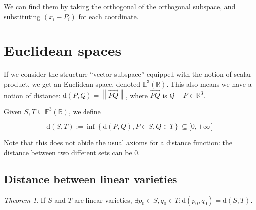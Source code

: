 \documentclass[12pt,a4paper]{report}
\newcommand{\norm}[1]{\left\lVert#1\right\rVert}
\numberwithin{equation}{section}
\theoremstyle{definition}
\theoremstyle{remark}
\newtheorem{theorem}{Theorem}[section]
\begin{document}
We can find them by taking the orthogonal of the orthogonal subspace, and substituting $(x_i - P_i)$ for each coordinate.

\section{Euclidean spaces}

If we consider the structure ``vector subspace'' equipped with the notion of scalar product, we get an Euclidean space, denoted $\mathbb{E} ^3 (\mathbb{R})$. This also means we have a notion of distance: $\text{d}(P, Q) = \norm{\overrightarrow{PQ}}$, where $\overrightarrow{PQ}$ is $Q-P \in \mathbb{R}^3$.

Given $S, T \subseteq \mathbb{E}^3 (\mathbb{R})$, we define

\begin{equation}
\text{d} (S, T) := \inf \left\lbrace \text{d} (P, Q), P \in S, Q \in T\right\rbrace \subseteq [0, +\infty [
\end{equation}

Note that this does not abide the usual axioms for a distance function: the distance between two different sets can be 0.

\subsection{Distance between linear varieties}

\begin{theorem}
If $S$ and $T$ are linear varieties, $\exists p_0 \in S, q_0 \in T : \text{d} (p_0, q_0) = \text{d} (S, T)$.
\end{theorem}
\end{document}
